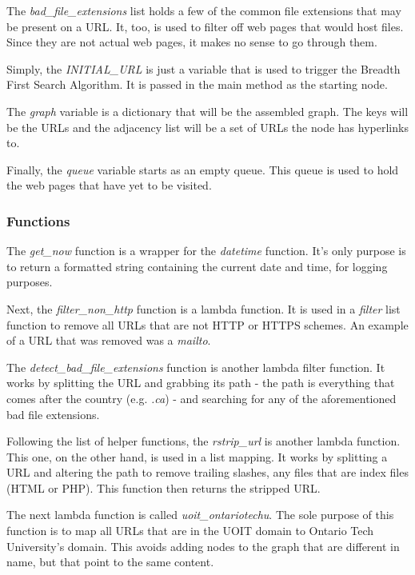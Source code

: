 The \textit{bad\_file\_extensions} list holds a few of the common file extensions that may be present on a URL. It, too, is used to filter off web pages that would host files. Since they are not actual web pages, it makes no sense to go through them.

Simply, the \textit{INITIAL\_URL} is just a variable that is used to trigger the Breadth First Search Algorithm. It is passed in the main method as the starting node.

The \textit{graph} variable is a dictionary that will be the assembled graph. The keys will be the URLs and the adjacency list will be a set of URLs the node has hyperlinks to.

Finally, the \textit{queue} variable starts as an empty queue. This queue is used to hold the web pages that have yet to be visited.

\subsubsection{Functions}
The \textit{get\_now} function is a wrapper for the \textit{datetime} function. It's only purpose is to return a formatted string containing the current date and time, for logging purposes.

Next, the \textit{filter\_non\_http} function is a lambda function. It is used in a \textit{filter} list function to remove all URLs that are not HTTP or HTTPS schemes. An example of a URL that was removed was a \textit{mailto}.

The \textit{detect\_bad\_file\_extensions} function is another lambda filter function. It works by splitting the URL and grabbing its path - the path is everything that comes after the country (e.g. \textit{.ca}) - and searching for any of the aforementioned bad file extensions.

Following the list of helper functions, the \textit{rstrip\_url} is another lambda function. This one, on the other hand, is used in a list mapping. It works by splitting a URL and altering the path to remove trailing slashes, any files that are index files (HTML or PHP). This function then returns the stripped URL.

The next lambda function is called \textit{uoit\_ontariotechu}. The sole purpose of this function is to map all URLs that are in the UOIT domain to Ontario Tech University's domain. This avoids adding nodes to the graph that are different in name, but that point to the same content.

